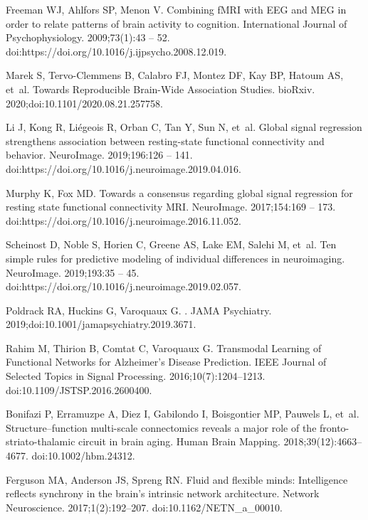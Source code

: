 \documentclass[10pt,letterpaper]{article}
\begin{document}
\begin{thebibliography}{10}
Freeman WJ, Ahlfors SP, Menon V.
\newblock Combining fMRI with EEG and MEG in order to relate patterns of brain
  activity to cognition.
\newblock International Journal of Psychophysiology. 2009;73(1):43 -- 52.
\newblock doi:{https://doi.org/10.1016/j.ijpsycho.2008.12.019}.

Marek S, Tervo-Clemmens B, Calabro FJ, Montez DF, Kay BP, Hatoum AS, et~al.
\newblock Towards Reproducible Brain-Wide Association Studies.
\newblock bioRxiv. 2020;doi:{10.1101/2020.08.21.257758}.

Li J, Kong R, Liégeois R, Orban C, Tan Y, Sun N, et~al.
\newblock Global signal regression strengthens association between
  resting-state functional connectivity and behavior.
\newblock NeuroImage. 2019;196:126 -- 141.
\newblock doi:{https://doi.org/10.1016/j.neuroimage.2019.04.016}.

Murphy K, Fox MD.
\newblock Towards a consensus regarding global signal regression for resting
  state functional connectivity MRI.
\newblock NeuroImage. 2017;154:169 -- 173.
\newblock doi:{https://doi.org/10.1016/j.neuroimage.2016.11.052}.

Scheinost D, Noble S, Horien C, Greene AS, Lake EM, Salehi M, et~al.
\newblock Ten simple rules for predictive modeling of individual differences in
  neuroimaging.
\newblock NeuroImage. 2019;193:35 -- 45.
\newblock doi:{https://doi.org/10.1016/j.neuroimage.2019.02.057}.

Poldrack RA, Huckins G, Varoquaux G.
.
\newblock JAMA Psychiatry. 2019;doi:{10.1001/jamapsychiatry.2019.3671}.

{Rahim} M, {Thirion} B, {Comtat} C, {Varoquaux} G.
\newblock Transmodal Learning of Functional Networks for Alzheimer's Disease
  Prediction.
\newblock IEEE Journal of Selected Topics in Signal Processing.
  2016;10(7):1204--1213.
\newblock doi:{10.1109/JSTSP.2016.2600400}.

Bonifazi P, Erramuzpe A, Diez I, Gabilondo I, Boisgontier MP, Pauwels L, et~al.
\newblock Structure–function multi-scale connectomics reveals a major role of
  the fronto-striato-thalamic circuit in brain aging.
\newblock Human Brain Mapping. 2018;39(12):4663--4677.
\newblock doi:{10.1002/hbm.24312}.

Ferguson MA, Anderson JS, Spreng RN.
\newblock Fluid and flexible minds: Intelligence reflects synchrony in the
  brain’s intrinsic network architecture.
\newblock Network Neuroscience. 2017;1(2):192--207.
\newblock doi:{10.1162/NETN\_a\_00010}.


\end{thebibliography}
\end{document}

